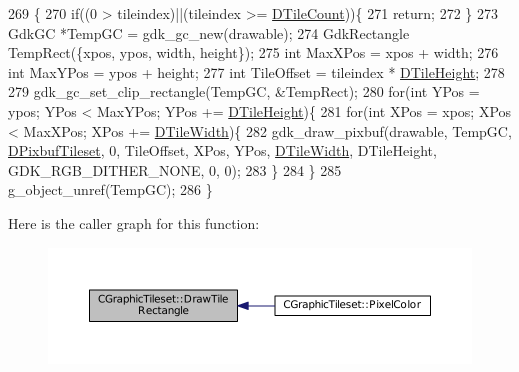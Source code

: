 \begin{DoxyCode}
269                                                                                                            
                     \{
270     \textcolor{keywordflow}{if}((0 > tileindex)||(tileindex >= \hyperlink{classCGraphicTileset_a39d942b370e47f441bf97385eb1037c8}{DTileCount}))\{
271         \textcolor{keywordflow}{return};
272     \}
273     GdkGC *TempGC = gdk\_gc\_new(drawable);
274     GdkRectangle TempRect(\{xpos, ypos, width, height\});
275     \textcolor{keywordtype}{int} MaxXPos = xpos + width;
276     \textcolor{keywordtype}{int} MaxYPos = ypos + height;
277     \textcolor{keywordtype}{int} TileOffset = tileindex * \hyperlink{classCGraphicTileset_af48f32e07d5fe69afd5f764318cc3244}{DTileHeight};
278     
279     gdk\_gc\_set\_clip\_rectangle(TempGC, &TempRect);
280     \textcolor{keywordflow}{for}(\textcolor{keywordtype}{int} YPos = ypos; YPos < MaxYPos; YPos += \hyperlink{classCGraphicTileset_af48f32e07d5fe69afd5f764318cc3244}{DTileHeight})\{
281         \textcolor{keywordflow}{for}(\textcolor{keywordtype}{int} XPos = xpos; XPos < MaxXPos; XPos += \hyperlink{classCGraphicTileset_a2d0c7d19865b81911a3a43d5cae50e00}{DTileWidth})\{
282             gdk\_draw\_pixbuf(drawable, TempGC, \hyperlink{classCGraphicTileset_a5d5adfcdbb347a6df3f57535ca08e3ef}{DPixbufTileset}, 0, TileOffset, XPos, YPos, 
      \hyperlink{classCGraphicTileset_a2d0c7d19865b81911a3a43d5cae50e00}{DTileWidth}, DTileHeight, GDK\_RGB\_DITHER\_NONE, 0, 0);
283         \}
284     \}
285     g\_object\_unref(TempGC);
286 \}
\end{DoxyCode}
Here is the caller graph for this function\+:\nopagebreak
\begin{figure}[H]
\begin{center}
\leavevmode
\includegraphics[width=350pt]{classCGraphicTileset_a81114be934d1efca29eb194fc2429658_icgraph}
\end{center}
\end{figure}
\hypertarget{classCGraphicTileset_a78db70086b4cd1085fd3b5d0d0dc5fdd}{}\label{classCGraphicTileset_a78db70086b4cd1085fd3b5d0d0dc5fdd} 
